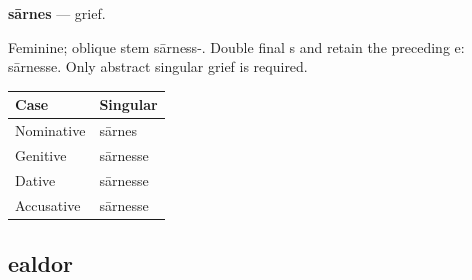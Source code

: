\par\begin{minipage}{\linewidth}\raggedright
\textbf{sārnes} — grief.

Feminine; oblique stem sārness-. Double final s and retain the preceding e: sārnesse. Only abstract singular grief is required.

\par\begingroup
\fontsize{10.5}{13.2}\selectfont
\setlength{\LTleft}{0pt}\setlength{\LTright}{\fill}
\noindent
\begin{tabular}{@{}>{\raggedright\arraybackslash}p{60.59mm}>{\raggedright\arraybackslash}p{60.59mm}@{}}
\toprule
\textbf{Case} & \textbf{Singular} \\
\midrule
Nominative & sārnes \\
Genitive & sārnesse \\
Dative & sārnesse \\
Accusative & sārnesse \\
\bottomrule
\end{tabular}
\par\endgroup

\end{minipage}\par
{}
\subsection*{ealdor}

